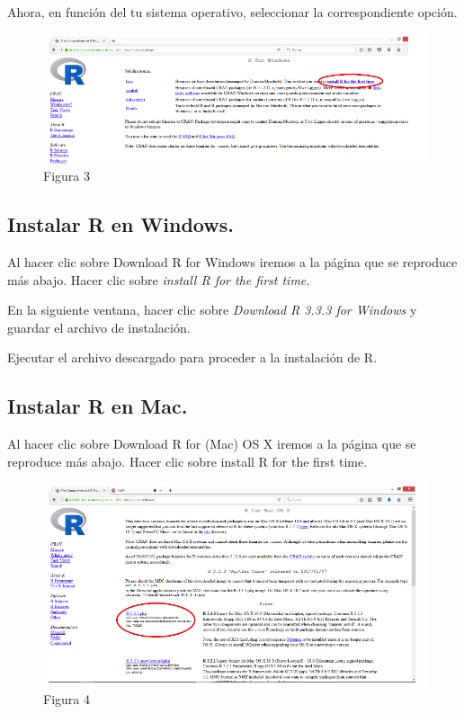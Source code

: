 \documentclass[
]{book}
\begin{document}
Ahora, en función del tu sistema operativo, seleccionar la correspondiente opción.

\begin{figure}
\centering
\includegraphics{imagenes/03.png}
\caption{Figura 3}
\end{figure}

\hypertarget{instalar-r-en-windows.}{%
\subsection{Instalar R en Windows.}\label{instalar-r-en-windows.}}

Al hacer clic sobre Download R for Windows iremos a la página que se reproduce más abajo. Hacer clic sobre \emph{install R for the first time.}

En la siguiente ventana, hacer clic sobre \emph{Download R 3.3.3 for Windows} y guardar el archivo de instalación.

Ejecutar el archivo descargado para proceder a la instalación de R.

\hypertarget{instalar-r-en-mac.}{%
\subsection{Instalar R en Mac.}\label{instalar-r-en-mac.}}

Al hacer clic sobre Download R for (Mac) OS X iremos a la página que se reproduce más abajo. Hacer clic sobre install R for the first time.

\begin{figure}
\centering
\includegraphics{imagenes/04.png}
\caption{Figura 4}
\end{figure}
\end{document}

